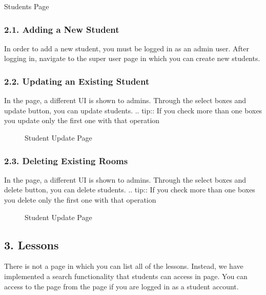 \documentclass[letterpaper,10pt,english]{sphinxmanual}
\begin{document}
Students Page


\subsubsection{2.1. Adding a New Student}
\label{\detokenize{user/mehmet:adding-a-new-student}}
In order to add a new student, you must be logged in as an admin user. After logging in, navigate to the super user page in which you can create new students.

\begin{figure}[htbp]
\centering

\noindent{}
\end{figure}


\subsubsection{2.2. Updating an Existing Student}
\label{\detokenize{user/mehmet:updating-an-existing-student}}
In the  page, a different UI is shown to admins. Through the select boxes and update button, you can update students.
.. tip:: If you check more than one boxes you update only the first one with that operation

\begin{figure}[htbp]
\centering
\capstart

\noindent{}
\caption{Student Update Page}\label{\detokenize{user/mehmet:id3}}\end{figure}


\subsubsection{2.3. Deleting Existing Rooms}
\label{\detokenize{user/mehmet:deleting-existing-rooms}}
In the  page, a different UI is shown to admins. Through the select boxes and delete button, you can delete students.
.. tip:: If you check more than one boxes you delete only the first one with that operation

\begin{figure}[htbp]
\centering
\capstart

\noindent{}
\caption{Student Update Page}\label{\detokenize{user/mehmet:id4}}\end{figure}


\subsection{3. Lessons}
\label{\detokenize{user/mehmet:lessons}}
There is not a page in which you can list all of the lessons. Instead, we have implemented a search functionality that students can access in  page. You can access to the  page from the  page if you are logged in as a student account.
\end{document}
